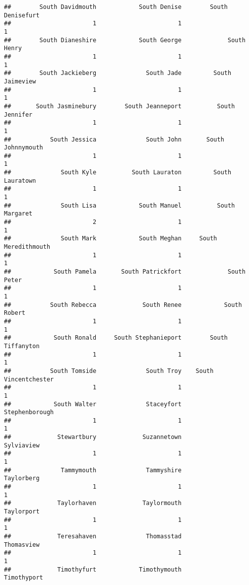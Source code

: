 \documentclass[
]{article}
\begin{document}
\begin{verbatim}
##        South Davidmouth            South Denise        South Denisefurt 
##                       1                       1                       1 
##        South Dianeshire            South George             South Henry 
##                       1                       1                       1 
##        South Jackieberg              South Jade         South Jaimeview 
##                       1                       1                       1 
##       South Jasminebury        South Jeanneport          South Jennifer 
##                       1                       1                       1 
##           South Jessica              South John       South Johnnymouth 
##                       1                       1                       1 
##              South Kyle          South Lauraton         South Lauratown 
##                       1                       1                       1 
##              South Lisa            South Manuel          South Margaret 
##                       2                       1                       1 
##              South Mark            South Meghan     South Meredithmouth 
##                       1                       1                       1 
##            South Pamela       South Patrickfort             South Peter 
##                       1                       1                       1 
##           South Rebecca             South Renee            South Robert 
##                       1                       1                       1 
##            South Ronald     South Stephanieport        South Tiffanyton 
##                       1                       1                       1 
##           South Tomside              South Troy    South Vincentchester 
##                       1                       1                       1 
##            South Walter              Staceyfort          Stephenborough 
##                       1                       1                       1 
##             Stewartbury             Suzannetown              Sylviaview 
##                       1                       1                       1 
##              Tammymouth              Tammyshire              Taylorberg 
##                       1                       1                       1 
##             Taylorhaven             Taylormouth              Taylorport 
##                       1                       1                       1 
##             Teresahaven              Thomasstad              Thomasview 
##                       1                       1                       1 
##             Timothyfurt            Timothymouth             Timothyport 

\end{verbatim}
\end{document}
